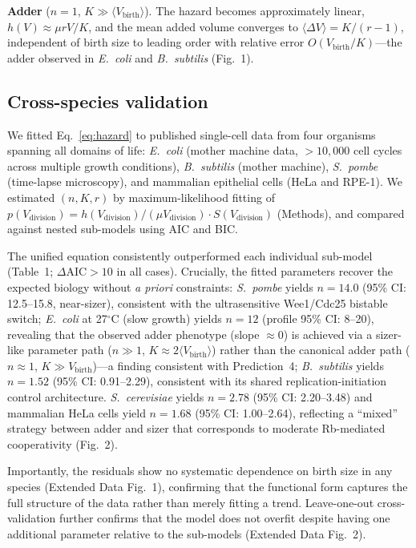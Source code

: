 \documentclass[11pt]{article}
\newcommand{\Vbirth}{V_{\text{birth}}}
\newcommand{\Vdiv}{V_{\text{division}}}
\newcommand{\DeltaV}{\Delta V}
\newcommand{\Ecoli}{\textit{E.~coli}}
\newcommand{\Spombe}{\textit{S.~pombe}}
\newcommand{\Scerevisiae}{\textit{S.~cerevisiae}}
\newcommand{\Bsubtilis}{\textit{B.~subtilis}}
\begin{document}
\textbf{Adder} ($n = 1$, $K \gg \langle\Vbirth\rangle$).  The
hazard becomes approximately linear, $h(V) \approx \mu r V/K$,
and the mean added volume converges to
$\langle\DeltaV\rangle = K/(r-1)$, independent of birth size to
leading order with relative error $O(\Vbirth/K)$---the adder
observed in \Ecoli{} and
\Bsubtilis{}\cite{campos2014,taheri2015} (Fig.~1).

\subsection*{Cross-species validation}

We fitted Eq.~\ref{eq:hazard} to published single-cell data from
four organisms spanning all domains of life: \Ecoli{} (mother machine
data, $>10{,}000$ cell cycles across multiple growth
conditions\cite{wang2010,taheri2015}), \Bsubtilis{} (mother
machine\cite{taheri2015}), \Spombe{} (time-lapse
microscopy\cite{fantes1977,wood2015}), and mammalian epithelial cells
(HeLa and RPE-1\cite{cadart2018}).  We estimated $(n, K, r)$ by maximum-likelihood fitting of
$p(\Vdiv) = h(\Vdiv)/(\mu\Vdiv) \cdot S(\Vdiv)$ (Methods), and
compared against nested sub-models using AIC and BIC.

The unified equation consistently outperformed each individual
sub-model (Table~1; $\Delta\text{AIC} > 10$ in all cases).
Crucially, the fitted parameters recover the expected biology without
\textit{a priori} constraints:
\Spombe{} yields $n = 14.0$ (95\% CI: 12.5--15.8, near-sizer),
consistent with the ultrasensitive Wee1/Cdc25 bistable
switch\cite{wood2015};
\Ecoli{} at 27$^\circ$C (slow growth) yields $n = 12$
(profile 95\% CI: 8--20), revealing that the observed adder
phenotype (slope $\approx 0$) is achieved via a sizer-like
parameter path ($n \gg 1$, $K \approx 2\langle\Vbirth\rangle$)
rather than the canonical adder path ($n \approx 1$,
$K \gg \Vbirth$)---a finding consistent with Prediction~4;
\Bsubtilis{} yields $n = 1.52$ (95\% CI: 0.91--2.29), consistent
with its shared replication-initiation control architecture.
\Scerevisiae{} yields $n = 2.78$ (95\% CI: 2.20--3.48) and
mammalian HeLa cells yield $n = 1.68$ (95\% CI: 1.00--2.64),
reflecting a ``mixed'' strategy between adder and
sizer\cite{cadart2018,ginzberg2015} that corresponds to moderate
Rb-mediated cooperativity (Fig.~2).

Importantly, the residuals show no systematic dependence on birth
size in any species (Extended Data Fig.~1), confirming that the
functional form captures the full structure of the data rather than
merely fitting a trend.  Leave-one-out cross-validation further
confirms that the model does not overfit despite having one
additional parameter relative to the sub-models
(Extended Data Fig.~2).
\end{document}
